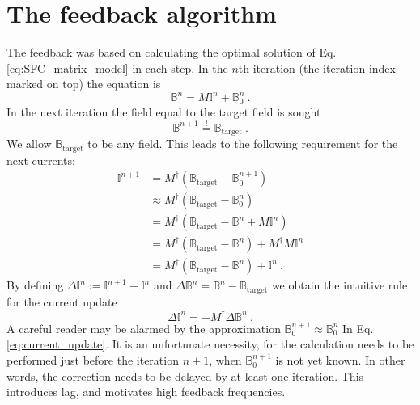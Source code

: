 \section{The feedback algorithm}
The feedback was based on calculating the optimal solution of Eq.\,\ref{eq:SFC_matrix_model} in each step.
In the $n$th iteration (the iteration index marked on top) the equation is
\begin{equation}
  \mathbb{B}^n = M \mathbb{I}^n + \mathbb{B}_0^n \ .
\end{equation}
In the next iteration the field equal to the target field is sought
\begin{equation}
  \mathbb{B}^{n+1} \overset{!}{=} \mathbb{B}_\text{target} \ .
\end{equation}
We allow $\mathbb{B}_\text{target}$ to be any field.
This leads to the following requirement for the next currents:
\begin{align}
  \mathbb{I}^{n+1} &=
    M^\dagger \left( \mathbb{B}_\text{target} - \mathbb{B}_0^{n+1} \right) \nonumber \\
    &\approx M^\dagger \left( \mathbb{B}_\text{target} - \mathbb{B}_0^{n} \right) \nonumber \\
    &= M^\dagger \left( \mathbb{B}_\text{target} - \mathbb{B}^n + M \mathbb{I}^n \right) \nonumber \\
    &= M^\dagger \left( \mathbb{B}_\text{target} - \mathbb{B}^n \right) + M^\dagger M \mathbb{I}^n \nonumber \\
    &= M^\dagger \left( \mathbb{B}_\text{target} - \mathbb{B}^n \right) + \mathbb{I}^n \ . \label{eq:current_update}
\end{align}
By defining $\Delta\mathbb{I}^n := \mathbb{I}^{n+1} - \mathbb{I}^{n}$ and $\Delta\mathbb{B}^n = \mathbb{B}^n - \mathbb{B}_\text{target}$ we obtain the intuitive rule for the current update
\begin{equation}
  \Delta\mathbb{I}^n = - M^\dagger \Delta\mathbb{B}^n \ .
\end{equation}
A careful reader may be alarmed by the approximation $\mathbb{B}_0^{n+1} \approx \mathbb{B}_0^{n}$ In Eq.\,\ref{eq:current_update}.
It is an unfortunate necessity, for the calculation needs to be performed just before the iteration $n+1$, when $\mathbb{B}_0^{n+1}$ is not yet known.
In other words, the correction needs to be delayed by at least one iteration.
This introduces lag, and motivates high feedback frequencies.

